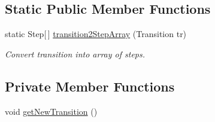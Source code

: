 \subsection*{Static Public Member Functions}
\begin{DoxyCompactItemize}
\item 
static Step\mbox{[}$\,$\mbox{]} \hyperlink{classgov_1_1nasa_1_1jpf_1_1inspector_1_1server_1_1pathanalysis_1_1_step_thread_backtracker_a9a2189f52ef815e3255e3a783719d582}{transition2\+Step\+Array} (Transition tr)
\begin{DoxyCompactList}\small\item\em Convert transition into array of steps. \end{DoxyCompactList}\end{DoxyCompactItemize}
\subsection*{Private Member Functions}
\begin{DoxyCompactItemize}
\item 
void \hyperlink{classgov_1_1nasa_1_1jpf_1_1inspector_1_1server_1_1pathanalysis_1_1_step_thread_backtracker_a66b53dbf076a2485ba0fe1efeacaf7ea}{get\+New\+Transition} ()
\end{DoxyCompactItemize}
